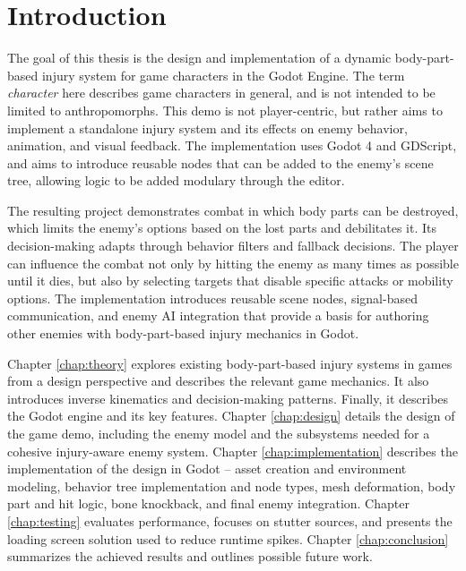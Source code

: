 
% 

\chapter{Introduction}

The goal of this thesis is the design and implementation of a dynamic body-part-based injury system for game characters in the Godot Engine. The term \emph{character} here describes game characters in general, and is not intended to be limited to anthropomorphs. This demo is not player-centric, but rather aims to implement a standalone injury system and its effects on enemy behavior, animation, and visual feedback. The implementation uses Godot 4 and GDScript, and aims to introduce reusable nodes that can be added to the enemy's scene tree, allowing logic to be added modulary through the editor.

The resulting project demonstrates combat in which body parts can be destroyed, which limits the enemy's options based on the lost parts and debilitates it. Its decision-making adapts through behavior filters and fallback decisions. The player can influence the combat not only by hitting the enemy as many times as possible until it dies, but also by selecting targets that disable specific attacks or mobility options. The implementation introduces reusable scene nodes, signal-based communication, and enemy AI integration that provide a basis for authoring other enemies with body-part-based injury mechanics in Godot.

Chapter \ref{chap:theory} explores existing body-part-based injury systems in games from a design perspective and describes the relevant game mechanics. It also introduces inverse kinematics and decision-making patterns. Finally, it describes the Godot engine and its key features.
Chapter \ref{chap:design} details the design of the game demo, including the enemy model and the subsystems needed for a cohesive injury-aware enemy system.
Chapter \ref{chap:implementation} describes the implementation of the design in Godot -- asset creation and environment modeling, behavior tree implementation and node types, mesh deformation, body part and hit logic, bone knockback, and final enemy integration.
Chapter \ref{chap:testing} evaluates performance, focuses on stutter sources, and presents the loading screen solution used to reduce runtime spikes.
Chapter \ref{chap:conclusion} summarizes the achieved results and outlines possible future work.



